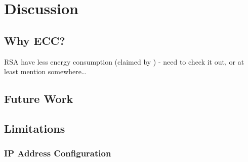 \chapter{Discussion}
\acresetall


\section{Why ECC?}
RSA have less energy consumption (claimed by \cite{hosseinisecure}) - need to
check it out, or at least mention somewhere\ldots

\section{Future Work}

\section{Limitations}

\subsection{IP Address Configuration}\label{ip_address_conf}